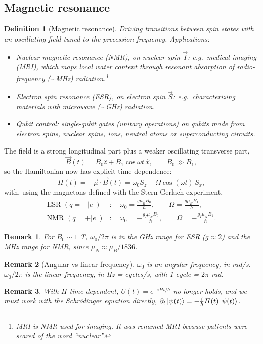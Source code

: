 \documentclass{article}
\newtheorem{definition}{Definition}
\newtheorem{remark}{Remark}
\begin{document}
\subsection{Magnetic resonance}
\label{sec:resonance}
\begin{definition}[Magnetic resonance]
    Driving transitions between spin states with an oscillating field tuned to the precession frequency. Applications:
    \begin{itemize}
        \item \emph{Nuclear magnetic resonance} (NMR), on nuclear spin $\vec{I}$: e.g.\ medical imaging (MRI), which maps local water content through resonant absorption of radio-frequency ($\sim$MHz) radiation.\footnote{MRI is NMR used for imaging. It was renamed MRI because patients were scared of the word ``nuclear''.}
        \item \emph{Electron spin resonance} (ESR), on electron spin $\vec{S}$: e.g.\ characterizing materials with microwave ($\sim$GHz) radiation.
        \item \emph{Qubit control}: single-qubit gates (unitary operations) on qubits made from electron spins, nuclear spins, ions, neutral atoms or superconducting circuits.
    \end{itemize}
\end{definition}
The field is a strong longitudinal part plus a weaker oscillating transverse part,
\begin{equation}
    \vec{B}(t) = B_0\hat{z} + B_1\cos\omega t\,\hat{x}, \qquad B_0 \gg B_1,
\end{equation}
so the Hamiltonian now has explicit time dependence:
\begin{equation}
    H(t) = -\vec{\mu}\cdot\vec{B}(t) = \omega_0S_z + \Omega\cos(\omega t)\,S_x,
\end{equation}
with, using the magnetons defined with the Stern-Gerlach experiment,
\begin{align*}
    \text{ESR } (q = -|e|)&: \quad \omega_0 = \frac{g\mu_BB_0}{\hbar}, \qquad \Omega = \frac{g\mu_BB_1}{\hbar}, \\
    \text{NMR } (q = +|e|)&: \quad \omega_0 = -\frac{g_I\mu_NB_0}{\hbar}, \qquad \Omega = -\frac{g_I\mu_NB_1}{\hbar}.
\end{align*}
\begin{remark}
    For $B_0 \sim 1$ T, $\omega_0/2\pi$ is in the GHz range for ESR ($g \approx 2$) and the MHz range for NMR, since $\mu_N \approx \mu_B/1836$.
\end{remark}
\begin{remark}[Angular vs linear frequency]
    $\omega_0$ is an angular frequency, in rad/s. $\omega_0/2\pi$ is the linear frequency, in Hz = cycles/s, with 1 cycle = $2\pi$ rad.
\end{remark}
\begin{remark}
    With $H$ time-dependent, $U(t) = e^{-iHt/\hbar}$ no longer holds, and we must work with the Schr\"odinger equation directly, $\partial_t\ket{\psi(t)} = -\frac{i}{\hbar}H(t)\ket{\psi(t)}$.
\end{remark}
\end{document}
